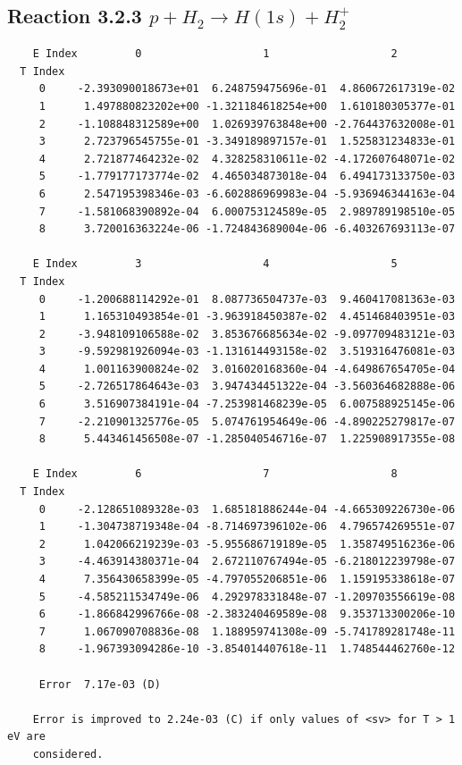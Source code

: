 \documentclass[12pt,dvipdfmx]{article}
\begin{document}
\newpage
\subsection{
Reaction 3.2.3 $   p + H_2 \rightarrow H(1s) + H_2^+$}


\begin{small}\begin{verbatim}
    E Index         0                   1                   2
  T Index
     0     -2.393090018673e+01  6.248759475696e-01  4.860672617319e-02
     1      1.497880823202e+00 -1.321184618254e+00  1.610180305377e-01
     2     -1.108848312589e+00  1.026939763848e+00 -2.764437632008e-01
     3      2.723796545755e-01 -3.349189897157e-01  1.525831234833e-01
     4      2.721877464232e-02  4.328258310611e-02 -4.172607648071e-02
     5     -1.779177173774e-02  4.465034873018e-04  6.494173133750e-03
     6      2.547195398346e-03 -6.602886969983e-04 -5.936946344163e-04
     7     -1.581068390892e-04  6.000753124589e-05  2.989789198510e-05
     8      3.720016363224e-06 -1.724843689004e-06 -6.403267693113e-07

    E Index         3                   4                   5
  T Index
     0     -1.200688114292e-01  8.087736504737e-03  9.460417081363e-03
     1      1.165310493854e-01 -3.963918450387e-02  4.451468403951e-03
     2     -3.948109106588e-02  3.853676685634e-02 -9.097709483121e-03
     3     -9.592981926094e-03 -1.131614493158e-02  3.519316476081e-03
     4      1.001163900824e-02  3.016020168360e-04 -4.649867654705e-04
     5     -2.726517864643e-03  3.947434451322e-04 -3.560364682888e-06
     6      3.516907384191e-04 -7.253981468239e-05  6.007588925145e-06
     7     -2.210901325776e-05  5.074761954649e-06 -4.890225279817e-07
     8      5.443461456508e-07 -1.285040546716e-07  1.225908917355e-08

    E Index         6                   7                   8
  T Index
     0     -2.128651089328e-03  1.685181886244e-04 -4.665309226730e-06
     1     -1.304738719348e-04 -8.714697396102e-06  4.796574269551e-07
     2      1.042066219239e-03 -5.955686719189e-05  1.358749516236e-06
     3     -4.463914380371e-04  2.672110767494e-05 -6.218012239798e-07
     4      7.356430658399e-05 -4.797055206851e-06  1.159195338618e-07
     5     -4.585211534749e-06  4.292978331848e-07 -1.209703556619e-08
     6     -1.866842996766e-08 -2.383240469589e-08  9.353713300206e-10
     7      1.067090708836e-08  1.188959741308e-09 -5.741789281748e-11
     8     -1.967393094286e-10 -3.854014407618e-11  1.748544462760e-12

     Error  7.17e-03 (D)

    Error is improved to 2.24e-03 (C) if only values of <sv> for T > 1 eV are
    considered.
\end{verbatim}\end{small}
\end{document}
